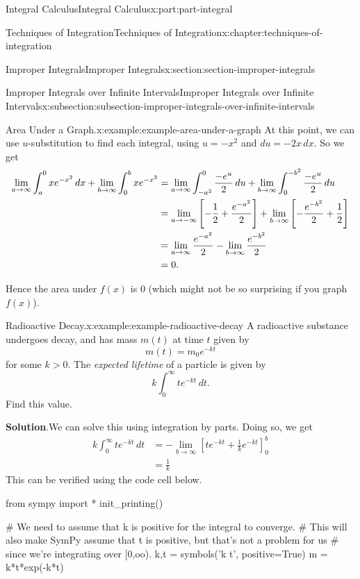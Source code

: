 \documentclass[twoside,10pt,]{book}
\newcommand{\blocktitlefont}{\relax}
\numberwithin{equation}{part}
\newcommand{\gt}{>}
\begin{document}
\begin{partptx}{Integral Calculus}{}{Integral Calculus}{}{}{x:part:part-integral}
\begin{chapterptx}{Techniques of Integration}{}{Techniques of Integration}{}{}{x:chapter:techniques-of-integration}
\begin{sectionptx}{Improper Integrals}{}{Improper Integrals}{}{}{x:section:section-improper-integrals}
\begin{subsectionptx}{Improper Integrals over Infinite Intervals}{}{Improper Integrals over Infinite Intervals}{}{}{x:subsection:subsection-improper-integrals-over-infinite-intervals}
\begin{example}{Area Under a Graph.}{x:example:example-area-under-a-graph}
At this point, we can use \(u\)-substitution to find each integral, using \(u = -x^{2}\) and \(du = -2x\,dx\). So we get%
\begin{align*}
\lim_{a\to\-\infty}\int_{a}^{0}xe^{-x^{2}}\,dx + \lim_{b\to\infty}\int_{0}^{b}xe^{-x^{2}} & = \lim_{a\to\-\infty}\int_{-a^{2}}^{0}\frac{-e^{u}}{2}\,du + \lim_{b\to\infty}\int_{0}^{-b^{2}}\frac{-e^{u}}{2}\,du \\
& = \lim_{a\to-\infty}\left[-\frac{1}{2} + \frac{e^{-a^{2}}}{2}\right] + \lim_{b\to\infty}\left[-\frac{e^{-b^{2}}}{2} + \frac{1}{2}\right]\\
& = \lim_{a\to\infty}\frac{e^{-a^{2}}}{2} - \lim_{b\to\infty}\frac{e^{-b^{2}}}{2} \\
& = 0. 
\end{align*}
%
\par
Hence the area under \(f(x)\) is \(0\) (which might not be so surprising if you graph \(f(x)\)).%
\end{example}
\begin{example}{Radioactive Decay.}{x:example:example-radioactive-decay}%
A radioactive substance undergoes decay, and has mass \(m(t)\) at time \(t\) given by%
\begin{equation*}
m(t) = m_{0}e^{-kt}
\end{equation*}
for some \(k\gt0\). The \emph{expected lifetime} of a particle is given by%
\begin{equation*}
k\int_{0}^{\infty}te^{-kt}\,dt.
\end{equation*}
Find this value.%
\par\smallskip%
\noindent\textbf{\blocktitlefont Solution}.\hypertarget{g:solution:idp105549278952608}{}\quad{}We can solve this using integration by parts. Doing so, we get%
\begin{align*}
k\int_{0}^{\infty}te^{-kt}\,dt & = -\lim_{b\to\infty}\left[te^{-kt} + \frac{1}{k}e^{-kt}\right]_{0}^{b} \\
& = \frac{1}{k} 
\end{align*}
This can be verified using the code cell below.%
\end{example}
\begin{sageinput}
from sympy import *
init_printing()

# We need to assume that k is positive for the integral to converge.
# This will also make SymPy assume that t is positive, but that's not a problem for us
# since we're integrating over [0,oo).
k,t = symbols('k t', positive=True)
m = k*t*exp(-k*t)


\end{sageinput}
\end{subsectionptx}
\end{sectionptx}
\end{chapterptx}
\end{partptx}
\end{document}
